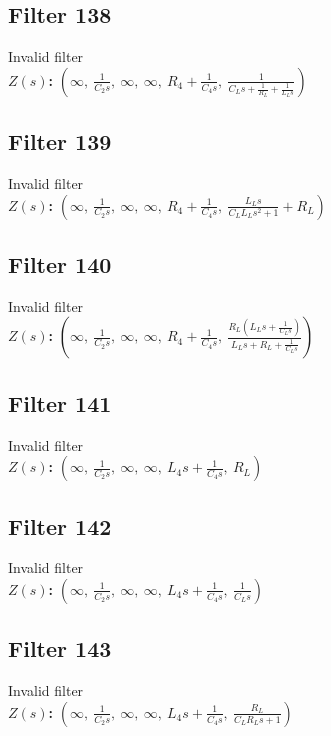 \documentclass{article}
\begin{document}
\subsection*{Filter 138}
Invalid filter \\ 
\textbf{$Z(s)$:} $\left( \infty, \  \frac{1}{C_{2} s}, \  \infty, \  \infty, \  R_{4} + \frac{1}{C_{4} s}, \  \frac{1}{C_{L} s + \frac{1}{R_{L}} + \frac{1}{L_{L} s}}\right)$ \\ 
\subsection*{Filter 139}
Invalid filter \\ 
\textbf{$Z(s)$:} $\left( \infty, \  \frac{1}{C_{2} s}, \  \infty, \  \infty, \  R_{4} + \frac{1}{C_{4} s}, \  \frac{L_{L} s}{C_{L} L_{L} s^{2} + 1} + R_{L}\right)$ \\ 
\subsection*{Filter 140}
Invalid filter \\ 
\textbf{$Z(s)$:} $\left( \infty, \  \frac{1}{C_{2} s}, \  \infty, \  \infty, \  R_{4} + \frac{1}{C_{4} s}, \  \frac{R_{L} \left(L_{L} s + \frac{1}{C_{L} s}\right)}{L_{L} s + R_{L} + \frac{1}{C_{L} s}}\right)$ \\ 
\subsection*{Filter 141}
Invalid filter \\ 
\textbf{$Z(s)$:} $\left( \infty, \  \frac{1}{C_{2} s}, \  \infty, \  \infty, \  L_{4} s + \frac{1}{C_{4} s}, \  R_{L}\right)$ \\ 
\subsection*{Filter 142}
Invalid filter \\ 
\textbf{$Z(s)$:} $\left( \infty, \  \frac{1}{C_{2} s}, \  \infty, \  \infty, \  L_{4} s + \frac{1}{C_{4} s}, \  \frac{1}{C_{L} s}\right)$ \\ 
\subsection*{Filter 143}
Invalid filter \\ 
\textbf{$Z(s)$:} $\left( \infty, \  \frac{1}{C_{2} s}, \  \infty, \  \infty, \  L_{4} s + \frac{1}{C_{4} s}, \  \frac{R_{L}}{C_{L} R_{L} s + 1}\right)$ \\ 
\end{document}
